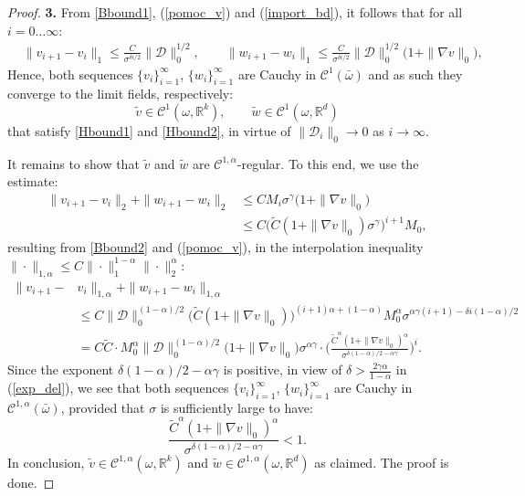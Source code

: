 \documentclass[10pt,a4paper]{amsart}
\newcommand{\R}{\mathbb{R}}
\begin{document}
\begin{proof}
\medskip

{\bf 3.} From \ref{Bbound1}, (\ref{pomoc_v}) and (\ref{import_bd}), it follows that for all $i=0\ldots \infty$:
\begin{equation*}
\begin{split}
& \|v_{i+1} - v_i\|_1\leq \frac{C}{\sigma^{\delta
    i/2}}\|\mathcal{D}\|_0^{1/2}, \qquad \|w_{i+1} - w_i\|_1\leq \frac{C}{\sigma^{\delta
    i/2}}\|\mathcal{D}\|_0^{1/2} \big(1+ \|\nabla v\|_0\big),
\end{split}
\end{equation*}
Hence, both sequences $\{v_i\}_{i=1}^\infty$, 
$\{w_i\}_{i=1}^\infty$ are Cauchy in $\mathcal{C}^1(\bar\omega)$ and as
such they converge to the limit fields, respectively: 
$$\tilde v\in\mathcal{C}^1(\omega,\R^k), \qquad \tilde w\in\mathcal{C}^1(\omega,\R^d)$$ 
that satisfy \ref{Hbound1} and \ref{Hbound2}, in virtue of
$\|\mathcal{D}_i\|_0\to 0$ as $i\to\infty$. 

\smallskip

It remains to show that $\tilde v$ and $\tilde w$ are
$\mathcal{C}^{1,\alpha}$-regular. To this end, we use the estimate:
\begin{equation*}
\begin{split}
\|v_{i+1} - v_i\|_2 + \|w_{i+1} - w_i\|_2 & \leq {C}M_i{\sigma^\gamma}
\big(1+ \|\nabla v\|_0\big) \\ & \leq C \Big(\tilde C (1+\|\nabla
v\|_0)\sigma^\gamma\Big)^{i+1} M_0, 
\end{split}
\end{equation*}
resulting from \ref{Bbound2} and (\ref{pomoc_v}), in the
interpolation inequality $\|\cdot\|_{1,\alpha}\leq C \|\cdot\|_{1}^{1-\alpha}\|\cdot\|_{2}^\alpha$:
\begin{equation*}
\begin{split}
\|v_{i+1} -& v_i\|_{1,\alpha}  + \|w_{i+1} - w_i\|_{1,\alpha} \\ & \leq {C}
\|\mathcal{D}\|_0^{(1-\alpha)/2} \Big(\tilde C (1+\|\nabla
v\|_0)\Big)^{(i+1)\alpha+(1-\alpha)} M_0^\alpha \sigma^{\alpha\gamma(i+1) - \delta i (1-\alpha)/2}
\\ & = {C} \tilde C \cdot M_0^\alpha\|\mathcal{D}\|_0^{(1-\alpha)/2} \big(1+\|\nabla
v\|_0\big) \sigma^{\alpha\gamma} \cdot \Big(\frac{\tilde C^\alpha (1+\|\nabla v\|_0)^{\alpha}}{
\sigma^{\delta (1-\alpha)/2-\alpha\gamma}}\Big)^i.
\end{split}
\end{equation*}
Since the exponent $\delta (1-\alpha)/2-\alpha\gamma$ is positive, in
view of $\delta>\frac{2\gamma\alpha}{1-\alpha}$ in (\ref{exp_del}), we
see that both sequences $\{v_i\}_{i=1}^\infty$, $\{w_i\}_{i=1}^\infty$ are Cauchy in
$\mathcal{C}^{1,\alpha}(\bar\omega)$, provided that $\sigma$ is
sufficiently large to have:
$$\frac{\tilde C^\alpha (1+\|\nabla v\|_0)^{\alpha}}{
\sigma^{\delta (1-\alpha)/2-\alpha\gamma}} <1.$$
In conclusion, $\tilde v\in\mathcal{C}^{1,\alpha}(\omega,\R^k)$ and
$\tilde w\in\mathcal{C}^{1,\alpha}(\omega,\R^d)$ as claimed. The proof
is done.
\end{proof}
\end{document}
